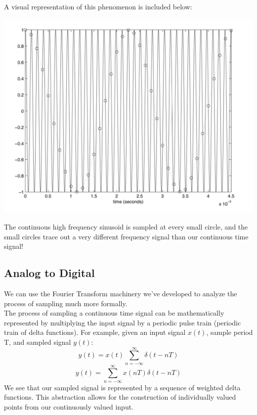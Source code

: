 \documentclass[a4paper]{article}
\numberwithin{equation}{section}
\begin{document}
A visual representation of this phenomenon is included below:
\begin{center}
\includegraphics[scale=0.5]{sampled.png}
\end{center}
The continuous high frequency sinusoid is sampled at every small circle, and the small circles trace out a very different frequency signal than our continuous time signal!

\subsection{Analog to Digital}
We can use the Fourier Transform machinery we've developed to analyze the process of sampling much more formally. \\

The process of sampling a continuous time signal can be mathematically represented by multiplying the input signal by a periodic pulse train (periodic train of delta functions). For example, given an input signal $x(t)$, sample period T,  and sampled signal $y(t)$:
\begin{equation}
y(t)=x(t)\sum_{n=-\infty}^{\infty}\delta(t-nT)
\end{equation}
\begin{equation}
y(t)=\sum_{n=-\infty}^{\infty}x(nT)\delta(t-nT)
\end{equation}
We see that our sampled signal is represented by a sequence of weighted delta functions. This abstraction allows for the construction of individually valued points from our continuously valued input. \\
\end{document}
